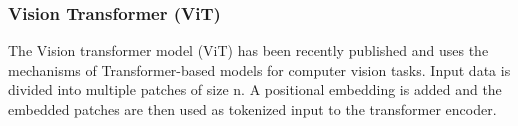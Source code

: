 \subsubsection{Vision Transformer (ViT)}
The Vision transformer model (ViT) has been recently published \cite{dosovitskiy_image_2021} and uses the mechanisms of Transformer-based models for computer vision tasks. Input data is divided into multiple patches of size n. A positional embedding is added and the embedded patches are then used as tokenized input to the transformer encoder. 



